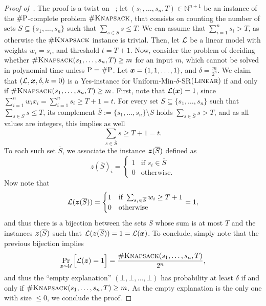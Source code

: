
\begin{proof}[Proof of~]
    The proof is a twist on ~\citet[Lemma 28]{NEURIPS2020_b1adda14}; let $(s_1, \ldots, s_n, T) \in \mathbb{N}^{n+1}$ be an instance of the $\# \mathrm{P}$-complete problem $\#\textsc{Knapsack}$, that consists on counting the number of sets $S \subseteq \{s_1, \ldots, s_n\}$ such that $\sum_{s \in S}s \leq T$.  
    We can assume that $\sum_{i=1}^n s_i > T$, as otherwise the $\# \textsc{Knapsack}$ instance is trivial.
    Then, let $\mathcal{L}$ be a linear model with weights $w_i = s_i$, and threshold $t = T+1$.
    Now, consider the problem of deciding whether $\#\textsc{Knapsack}(s_1, \ldots, s_n, T) \geq m$ for an input $m$, which cannot be solved in polynomial time unless $\mathrm{P} = \# \mathrm{P}$.
    Let ${\bm{x}} = (1, 1, \ldots, 1)$, and $\delta = \frac{m}{2^{n}}$. We claim that $(\mathcal{L}, {\bm{x}}, \delta, k=0)$ is a Yes-instance for Uniform-Min-$\delta$-SR$(\textsc{Linear})$ if and only if $\#\textsc{Knapsack}(s_1, \ldots, s_n, T) \geq m$. 
    First, note that $\mathcal{L}({\bm{x}}) = 1$, since $\sum_{i=1}^n w_i x_i = \sum_{i=1}^n s_i \geq T+1 = t$. 
    For every set $S \subseteq \{s_1, \ldots, s_n\}$ such that $\sum_{s \in S}s \leq T$, its complement $\overline{S} := \{s_1, \ldots, s_n\} \setminus S$ holds $\sum_{s \in \overline{S}}s > T$, and as all values are integers, this implies as well
    \[
        \sum_{s \in \overline{S}} s \geq T+1 = t.
    \]
    To each such set $\overline{S}$, we associate the instance ${\bm{z}}(\overline{S})$ defined as
    \[
        z(\overline{S})_i = \begin{cases}
            1 & \text{if } s_i \in \overline{S}\\
            0 & \text{otherwise}.
        \end{cases}
    \]
    Now note that 
    \[
        \mathcal{L}({\bm{z}}(\overline{S})) = \begin{cases}
            1 & \text{if } \sum_{s_i \in \overline{S}} w_i \geq T+1\\
            0 & \text{otherwise} \end{cases} = 1,
    \]
    and thus there is a bijection between the sets $S$ whose sum is at most $T$ and the instances ${\bm{z}}(\overline{S})$ such that $\mathcal{L}({\bm{z}}(\overline{S})) = 1 = \mathcal{L}({\bm{x}})$.
    To conclude, simply note that the previous bijection implies
    \[
        \Pr_{{\bm{z}} \sim \mathcal{U}}\Big[\mathcal{L}({\bm{z}}) = 1\Big] = \frac{\#\textsc{Knapsack}(s_1, \ldots, s_n, T)}{2^n},
    \] 
    and thus the ``empty explanation'' $(\bot, \bot, \ldots, \bot)$ has probability at least $\delta$ if and only if $\#\textsc{Knapsack}(s_1, \ldots, s_n, T) \geq m$. As the empty explanation is the only one with size $\leq 0$, we conclude the proof.
    


\end{proof}
